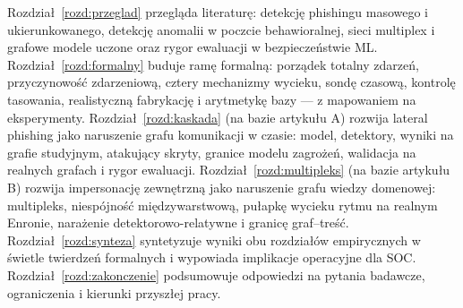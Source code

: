Rozdział~\ref{rozd:przeglad} przegląda literaturę: detekcję phishingu
masowego i ukierunkowanego, detekcję anomalii w poczcie
behawioralnej, sieci multiplex i grafowe modele uczone oraz rygor
ewaluacji w bezpieczeństwie ML. Rozdział~\ref{rozd:formalny} buduje
ramę formalną: porządek totalny zdarzeń, przyczynowość zdarzeniową,
cztery mechanizmy wycieku, sondę czasową, kontrolę tasowania,
realistyczną fabrykację i arytmetykę bazy --- z mapowaniem na
eksperymenty. Rozdział~\ref{rozd:kaskada} (na bazie artykułu A)
rozwija lateral phishing jako naruszenie grafu komunikacji w czasie:
model, detektory, wyniki na grafie studyjnym, atakujący skryty,
granice modelu zagrożeń, walidacja na realnych grafach i rygor
ewaluacji. Rozdział~\ref{rozd:multipleks} (na bazie artykułu B)
rozwija impersonację zewnętrzną jako naruszenie grafu wiedzy
domenowej: multipleks, niespójność międzywarstwową, pułapkę wycieku
rytmu na realnym Enronie, narażenie detektorowo-relatywne i granicę
graf--treść. Rozdział~\ref{rozd:synteza} syntetyzuje wyniki obu
rozdziałów empirycznych w świetle twierdzeń formalnych i wypowiada
implikacje operacyjne dla SOC. Rozdział~\ref{rozd:zakonczenie}
podsumowuje odpowiedzi na pytania badawcze, ograniczenia i kierunki
przyszłej pracy.
